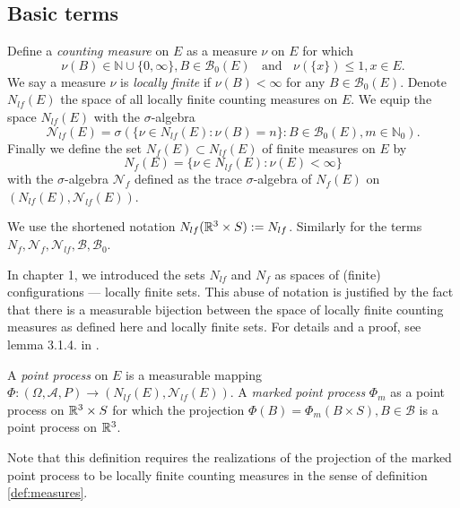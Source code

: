 \subsection{Basic terms}
\begin{definition}\label{def:measures}
Define a \textit{counting measure} on $E$ as a measure $\nu$ on $E$ for which
$$\nu(B)\in\mathbb N \cup \{0,\infty\}, B\in\mathcal B_0(E)\;\;\text{ and } \; \; \nu(\{x\})\leq 1, x\in E.$$
We say a measure $\nu$ is \textit{locally finite} if $\nu(B)<\infty$ for any $B\in \mathcal  B_0(E)$. Denote $N_{lf}(E)$ the space of all locally finite counting measures on $E$.
We equip the space $N_{lf}(E)$ with the $\sigma$-algebra
$$\mathcal N_{lf}(E)=\sigma(\{\nu \in N_{lf}(E): \nu(B)=n\}: B \in \mathcal B_0(E), m\in \mathbb N_0).$$
Finally we define the set $N_f(E) \subset N_{lf}(E)$ of finite measures on $E$ by
$$N_f(E) = \{\nu \in N_{lf}(E): \nu(E)<\infty\}$$
with the $\sigma$-algebra $\mathcal N_{f}$ defined as the trace $\sigma$-algebra of $N_{f}(E)$ on $(N_{lf}(E),\mathcal N_{lf}(E))$.
\end{definition}

We use the shortened notation $N_{lf}({\mathbb R^3}\times S) := N_{lf}$. Similarly for the terms $N_{f}, \mathcal N_{f}, \mathcal N_{lf}, \mathcal B, \mathcal B_0$.
\begin{remark}[Simple PP]
\end{remark}


\begin{remark}
In chapter 1, we introduced the sets $N_{lf}$ and $N_f$ as spaces of (finite) configurations --- locally finite sets. This abuse of notation is justified by the fact that there is a measurable bijection between the space of locally finite counting measures as defined here and locally finite sets. For details and a proof, see lemma 3.1.4. in \cite{SchneiderWeil2008}.   
\end{remark}

\begin{definition}
A \textit{point process} on $E$ is a measurable mapping $\Phi:(\Omega,\mathcal A, P) \to (N_{lf}(E),\mathcal N_{lf}(E))$. \newline
A \textit{marked point process} $\Phi_m$ as a point process on ${\mathbb R^3}\times S$ for which the projection $\Phi(B)=\Phi_m(B\times S), B \in \mathcal B$ is a point process on ${\mathbb R^3}$.
\end{definition}
Note that this definition requires the realizations of the projection of the marked point process to be locally finite counting measures in the sense of definition \ref{def:measures}.


